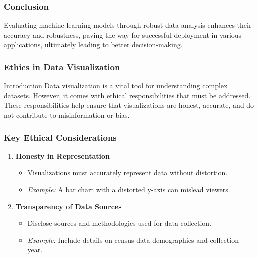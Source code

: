 \documentclass[aspectratio=169]{beamer}
\begin{document}
\begin{frame}[fragile]
    \frametitle{Conclusion}
    Evaluating machine learning models through robust data analysis enhances their accuracy and robustness, paving the way for successful deployment in various applications, ultimately leading to better decision-making.
\end{frame}

\begin{frame}[fragile]
    \frametitle{Ethics in Data Visualization}
    \begin{block}{Introduction}
        Data visualization is a vital tool for understanding complex datasets. However, it comes with ethical responsibilities that must be addressed. 
        These responsibilities help ensure that visualizations are honest, accurate, and do not contribute to misinformation or bias.
    \end{block}
\end{frame}

\begin{frame}[fragile]
    \frametitle{Key Ethical Considerations}
    \begin{enumerate}
        \item \textbf{Honesty in Representation}
            \begin{itemize}
                \item Visualizations must accurately represent data without distortion.
                \item \textit{Example:} A bar chart with a distorted y-axis can mislead viewers.
            \end{itemize}
        
        \item \textbf{Transparency of Data Sources}
            \begin{itemize}
                \item Disclose sources and methodologies used for data collection.
                \item \textit{Example:} Include details on census data demographics and collection year.
            \end{itemize}
    \end{enumerate}
\end{frame}
\end{document}
